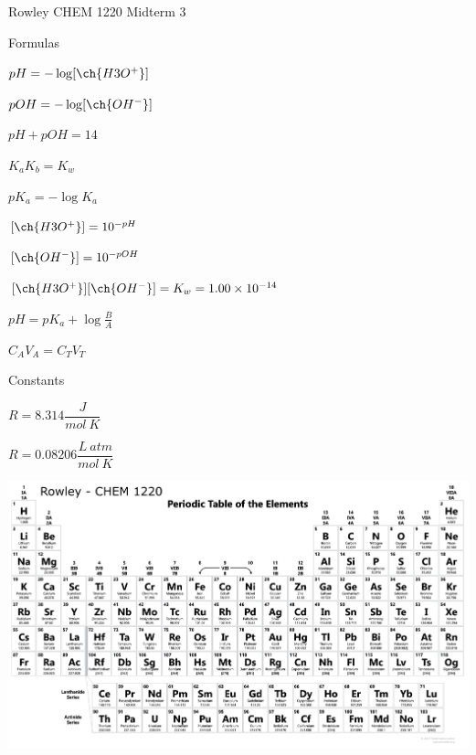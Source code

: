 \documentclass[12pt, letterpaper]{memoir}
\begin{document}
	\pagestyle{empty}
	\begin{center}
		{\Huge Rowley CHEM 1220 Midterm 3}
	\end{center}
	
	{\large Formulas}
	
	\begin{minipage}{0.5\linewidth}
		$pH=-\log[\ch{H3O^+}]$
		
		$pOH=-\log[\ch{OH^-}]$
		
		$pH + pOH = 14$
		
		$K_aK_b=K_w$
		
		$pK_a=-\log K_a$
	\end{minipage}
	\begin{minipage}{0.5\linewidth}
		$[\ch{H3O^+}] = 10^{-pH}$
		
		$[\ch{OH^-}] = 10^{-pOH}$
		
		$[\ch{H3O^+}][\ch{OH^-}] = K_w=1.00\times10^{-14}$
		
		$pH=pK_a+\log\frac{B}{A}$
		
		$C_AV_A=C_TV_T$
	\end{minipage}
	
	\vspace{2em}

	{\large Constants}
	
	$R=8.314 \dfrac{J}{mol~K}$
	
	$R=0.08206 \dfrac{L~atm}{mol~K}$

	


\hspace{6em}	\includegraphics[width=1.3\textwidth, angle =90]{UpdatedTable.png}

	\restoregeometry

	
\end{document}
